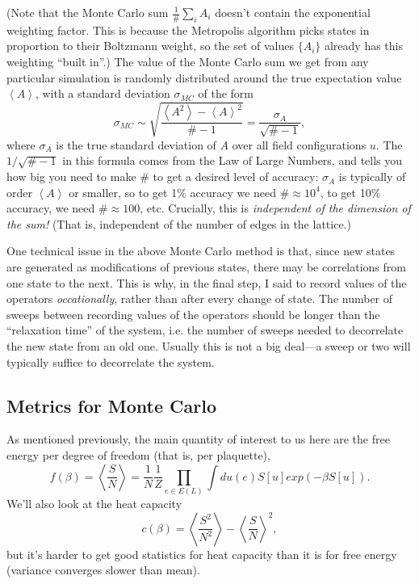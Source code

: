 \documentclass[9pt,twocolumn,twoside]{article}
\begin{document}
(Note that the Monte Carlo sum $\frac{1}{\#} \sum_i A_i$ doesn't contain the exponential weighting factor.  This is because the Metropolis algorithm picks states in proportion to their Boltzmann weight, so the set of values $\{A_i\}$ already has this weighting ``built in''.)  The value of the Monte Carlo sum we get from any particular simulation is randomly distributed around the true expectation value $\left<A\right>$, with a standard deviation $\sigma_{MC}$ of the form 
\begin{equation}
\sigma_{MC} \sim \sqrt{\frac{\left<A^2\right>-\left<A\right>^2}{\#-1}} = \frac{\sigma_A}{\sqrt{\#-1}},
\end{equation}
where $\sigma_A$ is the true standard deviation of $A$ over all field configurations $u$.  The $1/\sqrt{\#-1}$ in this formula comes from the Law of Large Numbers, and tells you how big you need to make $\#$ to get a desired level of accuracy:  $\sigma_A$ is typically of order $\left<A\right>$ or smaller, so to get 1\% accuracy we need $\# \approx 10^4$, to get 10\% accuracy, we need $\#\approx 100$, etc.  Crucially, this is \textit{independent of the dimension of the sum!}  (That is, independent of the number of edges in the lattice.)

One technical issue in the above Monte Carlo method is that, since new states are generated as modifications of previous states, there may be correlations from one state to the next.  This is why, in the final step, I said to record values of the operators \textit{occationally}, rather than after every change of state.  The number of sweeps between recording values of the operators should be longer than the ``relaxation time'' of the system, i.e. the number of sweeps needed to decorrelate the new state from an old one.  Usually this is not a big deal---a sweep or two will typically suffice to decorrelate the system.  

\subsection{Metrics for Monte Carlo}
As mentioned previously, the main quantity of interest to us here are the free energy per degree of freedom (that is, per plaquette),
\[f(\beta) = \left<\frac{S}{N}\right> = \frac{1}{N}\frac{1}{Z} \prod_{e\in E(L)} \int du(e) S[u] exp(-\beta S[u]). \]
We'll also look at the heat capacity 
\[c(\beta) = \left<\frac{S^2}{N^2}\right> - \left< \frac{S}{N}\right>^2,\]
but it's harder to get good statistics for heat capacity than it is for free energy (variance converges slower than mean).  
\end{document}
